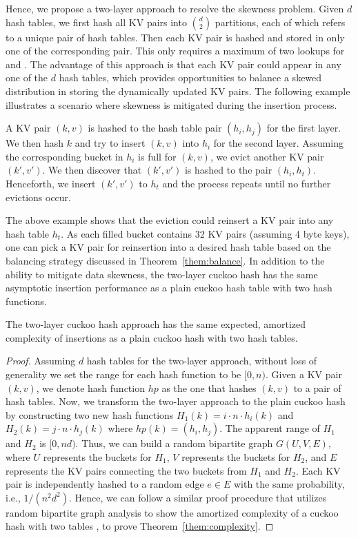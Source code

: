 Hence, we propose a two-layer approach to resolve the skewness problem.
Given $d$ hash tables, we first hash all KV pairs into $\binom{d}{2}$ partitions, 
each of which refers to a unique pair of hash tables. Then each KV pair is hashed and stored in only one of the corresponding pair. This only requires a maximum of two lookups for  and . The advantage of this approach is that each KV pair could appear in any one of the $d$ hash tables, which provides opportunities to balance a skewed distribution in storing the dynamically updated KV pairs. The following example illustrates a scenario where skewness is mitigated during the insertion process. 

\begin{example}
A KV pair $(k,v)$ is hashed to the hash table pair $(h_i,h_j)$ for the first layer. We then hash $k$ and try to insert $(k,v)$ into $h_i$ for the second layer. Assuming the corresponding bucket in $h_i$ is full for $(k,v)$, we evict another KV pair $(k',v')$. We then discover that $(k',v')$ is hashed to the pair $(h_i,h_t)$. Henceforth, we insert $(k',v')$ to $h_t$ and the process repeats until no further evictions occur.
\end{example}

The above example shows that the eviction could reinsert a KV pair into any hash table $h_t$. As each filled bucket contains 32 KV pairs (assuming 4 byte keys), one can pick a KV pair for reinsertion into a desired hash table based on the balancing strategy discussed in Theorem~\ref{them:balance}. In addition to the ability to mitigate data skewness, the two-layer cuckoo hash has the same asymptotic insertion performance as a plain cuckoo hash table with two hash functions.  

\begin{theorem}\label{them:complexity}
The two-layer cuckoo hash approach has the same expected, amortized complexity of insertions as a plain cuckoo hash with two hash tables. 
\end{theorem}

\begin{proof}
Assuming $d$ hash tables for the two-layer approach, without loss of generality we set the range for each hash function to be $[0,n)$. Given a KV pair $(k,v)$, we denote hash function $hp$ as the one that hashes $(k,v)$ to a pair of hash tables.
Now, we transform the two-layer approach to the plain cuckoo hash by constructing two new hash functions $H_1(k) = i \cdot n \cdot h_i(k)$ and $H_2(k) = j \cdot n \cdot h_j(k)$ where $hp(k) = (h_i,h_j)$.
The apparent range of $H_1$ and $H_2$ is $[0,nd)$. Thus, we can build a random bipartite graph $G(U,V,E)$, where $U$ represents the buckets for $H_1$, $V$ represents the buckets for $H_2$, and $E$ represents the KV pairs connecting the two buckets from $H_1$ and $H_2$. 
Each KV pair is independently hashed to a random edge $e \in E$ with the same probability, i.e., $1/(n^2d^2)$. Hence, we can follow a similar proof procedure that utilizes random bipartite graph analysis to show the amortized complexity of a cuckoo hash with two tables \cite{kutzelnigg:hal-01184689}, to prove Theorem~\ref{them:complexity}.
\end{proof}



